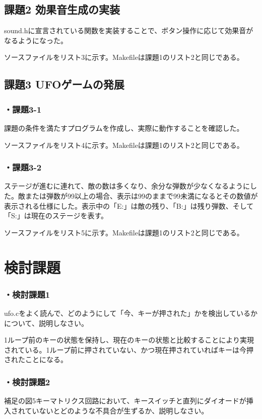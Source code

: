 ﻿\documentclass{jarticle}
\begin{document}
\subsection{課題2 効果音生成の実装}
sound.hに宣言されている関数を実装することで、ボタン操作に応じて効果音がなるようになった。


ソースファイルをリスト3に示す。Makefileは課題1のリスト2と同じである。

\subsection{課題3 UFOゲームの発展}
\subsubsection*{・課題3-1}
課題の条件を満たすプログラムを作成し、実際に動作することを確認した。


ソースファイルをリスト4に示す。Makefileは課題1のリスト2と同じである。

\subsubsection*{・課題3-2}
ステージが進むに連れて、敵の数は多くなり、余分な弾数が少なくなるようにした。敵または弾数が99以上の場合、表示は99のままで99未満になるとその数値が表示される仕様にした。表示中の「E:」は敵の残り、「B:」は残り弾数、そして「S:」は現在のステージを表す。


ソースファイルをリスト5に示す。Makefileは課題1のリスト2と同じである。


\section{検討課題}
\subsubsection*{・検討課題1}
ufo.cをよく読んで、どのようにして「今、キーが押された」かを検出しているかについて、説明しなさい。


1ループ前のキーの状態を保持し、現在のキーの状態と比較することにより実現されている。1ループ前に押されていない、かつ現在押されていればキーは今押されたことになる。

\subsubsection*{・検討課題2}
補足の図5キーマトリクス回路において、キースイッチと直列にダイオードが挿入されていないとどのような不具合が生ずるか、説明しなさい。
\end{document}
